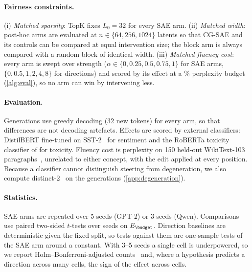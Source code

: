 \documentclass[11pt,a4paper]{article}
\theoremstyle{remark}
\begin{document}
\paragraph{Fairness constraints.}
(i) \emph{Matched sparsity}: TopK fixes $L_0=32$ for every SAE arm. (ii) \emph{Matched width}:
post-hoc arms are evaluated at $n\in\{64,256,1024\}$ latents so that CG-SAE and its controls
can be compared at equal intervention size; the block arm is always compared with a random
block of identical width. (iii) \emph{Matched fluency cost}: every arm is swept over strength
($\alpha\in\{0,0.25,0.5,0.75,1\}$ for SAE arms, $\{0,0.5,1,2,4,8\}$ for directions) and scored by
its effect at a \budget\% perplexity budget (\cref{alg:eval}), so no arm can win by
intervening less.

\paragraph{Evaluation.}
Generations use greedy decoding (32 new tokens) for every arm, so that differences are not
decoding artefacts. Effects are scored by external classifiers: DistilBERT fine-tuned on
SST-2~\citep{sanh2019distilbert,socher2013sst} for sentiment and the RoBERTa toxicity classifier
of \citet{logacheva2022paradetox} for toxicity. Fluency cost is perplexity on 150 held-out
WikiText-103 paragraphs~\citep{merity2017wikitext}, unrelated to either concept, with the edit
applied at every position. Because a classifier cannot distinguish steering from degeneration,
we also compute distinct-2~\citep{li2016distinct} on the generations (\cref{app:degeneration}).

\paragraph{Statistics.}
SAE arms are repeated over 5 seeds (GPT-2) or 3 seeds (Qwen). Comparisons use paired two-sided
$t$-tests over seeds on $E_{\budget}$. Direction baselines are deterministic given the fixed split,
so tests against them are one-sample tests of the SAE arm around a constant. With 3--5 seeds a
single cell is underpowered, so we report Holm--Bonferroni-adjusted counts~\citep{holm1979} and,
where a hypothesis predicts a direction across many cells, the sign of the effect across cells.
\end{document}
